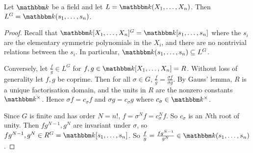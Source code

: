 \begin{theorem}
	Let \( \mathbbm k \) be a field and let \( L = \mathbbm k(X_1, \dots, X_n) \).
	Then \( L^G = \mathbbm k(s_1, \dots, s_n) \).
\end{theorem}
\begin{proof}
	Recall that \( \mathbbm k[X_1, \dots, X_n]^G = \mathbbm k[s_1, \dots, s_n] \) where the \( s_i \) are the elementary symmetric polynomials in the \( X_i \), and there are no nontrivial relations between the \( s_i \).
	In particular, \( \mathbbm k(s_1, \dots, s_n) \subseteq L^G \).

	Conversely, let \( \frac{f}{g} \in L^G \) for \( f, g \in \mathbbm k[X_1, \dots, X_n] = R \).
	Without loss of generality let \( f, g \) be coprime.
	Then for all \( \sigma \in G \), \( \frac{f}{g} = \frac{\sigma f}{\sigma g} \).
	By Gauss' lemma, \( R \) is a unique factorisation domain, and the units in \( R \) are the nonzero constants \( \mathbbm k^\times \).
	Hence \( \sigma f = c_\sigma f \) and \( \sigma g = c_\sigma g \) where \( c_\sigma \in \mathbbm k^\times \).

	Since \( G \) is finite and has order \( N = n! \), \( f = \sigma^N f = c_\sigma^N f \).
	So \( c_\sigma \) is an \( N \)th root of unity.
	Then \( fg^{N-1}, g^N \) are invariant under \( \sigma \), so \( fg^{N-1}, g^N \in R^G = \mathbbm k[s_1, \dots, s_n] \).
	So \( \frac{f}{g} = \frac{fg^{N-1}}{g^N} \in \mathbbm k(s_1, \dots, s_n) \).
\end{proof}
